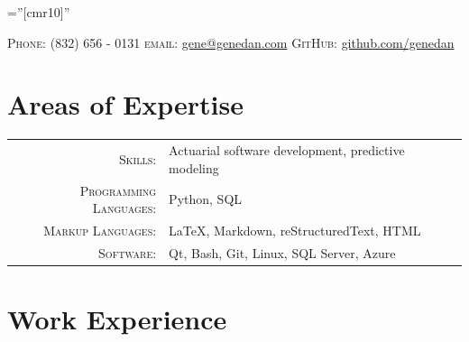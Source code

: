 \documentclass[10pt]{article} %
\begin{document}
\pagestyle{empty} %

\font\fb=''[cmr10]'' %


\par{\par} %

\begin{center}
\textsc{Phone:}  (832) 656 - 0131 \qquad
\textsc{email:}  \href{mailto:gene@genedan.com}{gene@genedan.com}\qquad
\textsc{GitHub:} \href{https://github.com/genedan}{github.com/genedan}
\end{center}



\section{Areas of Expertise}
\begin{tabular}{r|p{10cm}}
\textsc{Skills: } & Actuarial software development, predictive modeling\\
\textsc{Programming Languages: } & Python,  SQL\\
\textsc{Markup Languages: } & \LaTeX, Markdown, reStructuredText, HTML\\
\textsc{Software: } & Qt, Bash, Git, Linux, SQL Server, Azure\\
\end{tabular}


\section{Work Experience}
\end{document}
